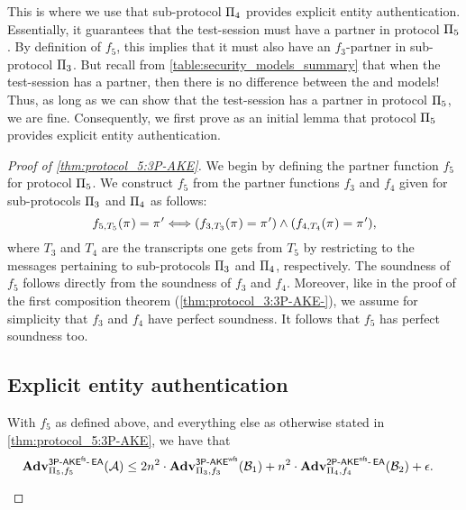 This is where we use that sub-protocol $\protocol_4$ provides explicit entity authentication.
Essentially,
it guarantees that the test-session must have a partner in protocol $\protocol_5$.
By definition of $f_5$,
this implies that it must also have an $f_3$-partner in sub-protocol $\protocol_3$.
But recall from \cref{table:security_models_summary} that when the test-session has a partner,
then there is no difference between the \akefstext and \akewfstext models!
Thus,
as long as we can show that the test-session has a partner in protocol $\protocol_5$,
we are fine.
Consequently,
we first prove as an initial lemma that protocol $\protocol_5$ provides explicit entity authentication.



\begin{proof}[Proof of \cref{thm:protocol_5:3P-AKE}]
We begin by defining the  partner function $f_5$  for protocol $\protocol_5$.
We construct $f_5$ from the partner functions $f_3$ and $f_4$ given for sub-protocols $\protocol_3$ and $\protocol_4$ 
as follows:
\begin{equation}
	f_{5,T_5}(\oracle) = \oracle' \Longleftrightarrow (f_{3,T_3}(\oracle) = \oracle') \land (f_{4,T_4}(\oracle) = \oracle')	,
\end{equation}
where $T_3$ and $T_4$ are the transcripts one gets from $T_5$ by restricting to the messages pertaining to sub-protocols $\protocol_3$ and $\protocol_4$,
respectively.
The soundness of $f_5$ follows directly from the soundness of $f_3$ and $f_4$. 
Moreover,
like in the proof of the first composition theorem (\cref{thm:protocol_3:3P-AKE-}),
we assume for simplicity that $f_3$ and $f_4$ have perfect soundness.
It follows that $f_5$ has perfect soundness too. 


\subsection{Explicit entity authentication}\label{sec:proof_of_EA_protocol_5}



\begin{lemma}\label{lemma:protocol_5:3P-AKE-EA}
With $f_5$ as defined above,
and everything else as otherwise stated in \cref{thm:protocol_5:3P-AKE},
we have that
\begin{equation*}
	\begin{split}
	\adv_{\protocol_5,f_5}^{\operatorname{\mathsf{3P-\akefs-\EA}}} (\A) 
		&\leq 2n^2 \cdot \adv_{\protocol_3, f_3}^{\operatorname{\mathsf{3P-\akewfs}}}(\A[B]_1) 
			+ n^2 \cdot \adv_{{\protocol_4},{f_4}}^{\operatorname{\mathsf{2P-\akenfs-\EA}}}(\A[B]_2) 
			+ \transcriptcollisionfunc .
	\end{split}
\end{equation*}
\end{lemma}


\end{proof}
